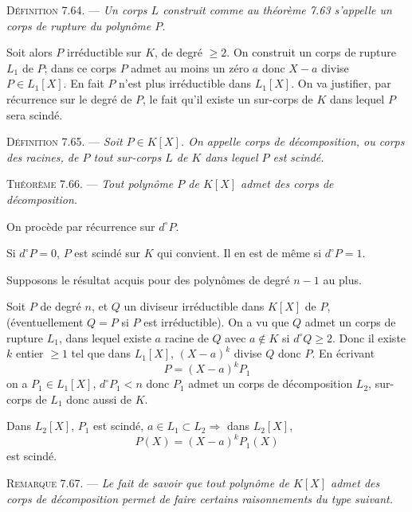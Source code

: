 \medskip\noindent\textsc{Définition 7.64.} --- \emph{Un corps $L$ construit comme au théorème 7.63 s'appelle un corps de rupture du polynôme $P$.}

Soit alors $P$ irréductible sur $K$, de degré $\ge2$. On construit un corps de rupture $L_1$ de $P$; dans ce corps $P$ admet au moins un zéro $a$ donc $X-a$ divise $P\in L_1[X]$. En fait $P$ n'est plus irréductible dans $L_1[X]$. On va justifier, par récurrence sur le degré de $P$, le fait qu'il existe un sur-corps de $K$ dans lequel $P$ sera scindé.

\medskip\noindent\textsc{Définition 7.65.} --- \emph{Soit $P\in K[X]$. On appelle corps de décomposition, ou corps des racines, de $P$ tout sur-corps $L$ de $K$ dans lequel $P$ est scindé.}

\medskip\noindent\textsc{Théorème 7.66.} --- \emph{Tout polynôme $P$ de $K[X]$ admet des corps de décomposition.}

On procède par récurrence sur $d^\circ P$.

Si $d^\circ P=0$, $P$ est scindé sur $K$ qui convient. Il en est de même si $d^\circ P=1$.

Supposons le résultat acquis pour des polynômes de degré $n-1$ au plus.

Soit $P$ de degré $n$, et $Q$ un diviseur irréductible dans $K[X]$ de $P$, (éventuellement $Q=P$ si $P$ est irréductible). On a vu que $Q$ admet un corps de rupture $L_1$, dans lequel existe $a$ racine de $Q$ avec $a\notin K$ si $d^\circ Q\ge2$. Donc il existe $k$ entier $\ge1$ tel que dans $L_1[X]$, $(X-a)^k$ divise $Q$ donc $P$. En écrivant
\[
P=(X-a)^kP_1
\]
on a $P_1\in L_1[X]$, $d^\circ P_1<n$ donc $P_1$ admet un corps de décomposition $L_2$, sur-corps de $L_1$ donc aussi de $K$.

Dans $L_2[X]$, $P_1$ est scindé, $a\in L_1\subset L_2\Rightarrow$ dans $L_2[X]$,
\[
P(X)=(X-a)^kP_1(X)
\]
est scindé. \bookend

\medskip\noindent\textsc{Remarque 7.67.} --- \emph{Le fait de savoir que tout polynôme de $K[X]$ admet des corps de décomposition permet de faire certains raisonnements du type suivant.}


